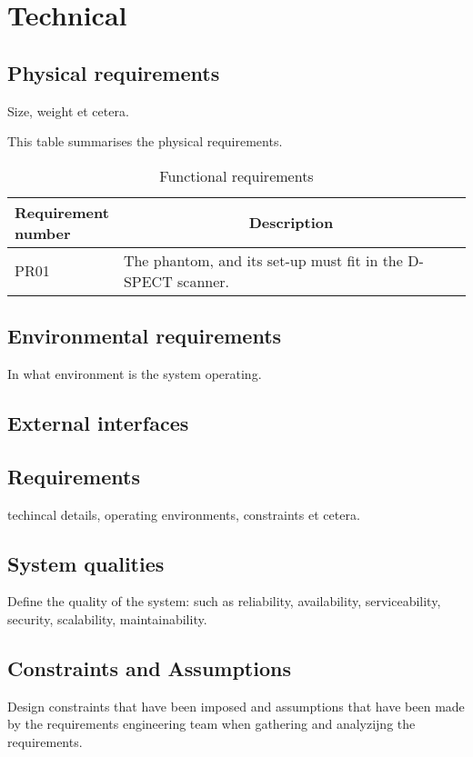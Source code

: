 \chapter{Technical}

\section{Physical requirements}
Size, weight et cetera.
\begin{table} [h]
\caption{Functional requirements}
\label{tab:physres}
This table summarises the physical requirements.
\begin{tabular}{l|p{120mm}|}
	\makecell[l]{Requirement \\ number} & \multicolumn{1}{c}{Description}\\
	\hline
	PR01 & The phantom, and its set-up must fit in the D-SPECT scanner. \\ 
	\cline{2-2}
\end{tabular}
\end{table}

\section{Environmental requirements}
In what environment is the system operating.

\section{External interfaces}

\section{Requirements}
techincal details, operating environments, constraints et cetera.

\section{System qualities}
Define the quality of the system: such as reliability, availability, serviceability, security, scalability, maintainability.

\section{Constraints and Assumptions}
Design constraints that have been imposed and assumptions that have been made by the requirements engineering team when gathering and analyzijng the requirements.
